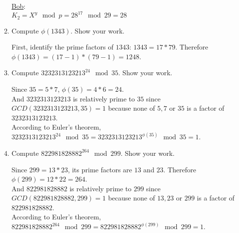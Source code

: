 \documentclass[11pt]{article}
\begin{document}
\begin{enumerate}
\underline{Bob}:\\
$K_2 = X^y \mod p = 28^{17} \mod 29 = 28$\\

\item Compute $\phi(1343)$. Show your work.

First, identify the prime factors of $1343$: $1343 = 17 *
79$. Therefore $\phi(1343) = (17-1) * (79-1) = 1248$.

\item Compute $3232313123213^{24} \mod 35$. Show your work.

Since $35 = 5 * 7$, $\phi(35) = 4 * 6 = 24$.\\ 
And $3232313123213$ is relatively prime to $35$ since
$GCD(3232313123213, 35) = 1$ because none of $5,7$ or $35$ is a factor
of $3232313123213$.\\  
According to Euler's theorem, $3232313123213^{24} \mod 35 =
3232313123213^{\phi(35)} \mod 35 = 1$.

\item Compute $822981828882^{264} \mod 299$. Show your work.

Since $299 = 13 * 23$, its prime factors are $13$ and $23$. Therefore
$\phi(299) = 12 * 22 = 264$.\\
And $822981828882$ is relatively prime to $299$ since
$GCD(822981828882, 299) = 1$ because none of $13,23$ or $299$ is a
factor of $822981828882$.\\
According to Euler's theorem, $822981828882^{264} \mod 299 =
822981828882^{\phi(299)} \mod 299 = 1$.

\end{enumerate}
\end{document}
